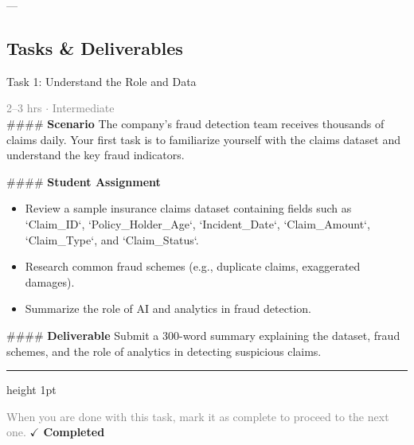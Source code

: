 \documentclass[10pt,a4paper]{article}
\begin{document}
---

\subsection*{Tasks \& Deliverables}

\begin{taskbox}{Task 1: Understand the Role and Data}

    {\small \textcolor{gray}{2--3 hrs $\cdot$ Intermediate}}\\[12pt]

    \#\#\#\# \textbf{Scenario}  
The company's fraud detection team receives thousands of claims daily. Your first task is to familiarize yourself with the claims dataset and understand the key fraud indicators.  

\#\#\#\# \textbf{Student Assignment}  
\begin{itemize}
    \item Review a sample insurance claims dataset containing fields such as `Claim\_ID`, `Policy\_Holder\_Age`, `Incident\_Date`, `Claim\_Amount`, `Claim\_Type`, and `Claim\_Status`.  
    \item Research common fraud schemes (e.g., duplicate claims, exaggerated damages).  
    \item Summarize the role of AI and analytics in fraud detection.  
\end{itemize}

\#\#\#\# \textbf{Deliverable}  
Submit a 300-word summary explaining the dataset, fraud schemes, and the role of analytics in detecting suspicious claims.\par

    \vspace{16pt}

    \textcolor{cardBorder}{\hrule height 1pt}\vspace{8pt}

    \small \textcolor{gray}{When you are done with this task, mark it as complete to proceed to the next one.} \hfill \textbf{\textcolor{brandDark}{$\checkmark$ Completed}}

\end{taskbox}
\end{document}
